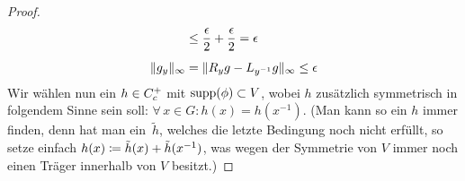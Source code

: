 \begin{proof}
\begin{align*}
        &\leq \frac{\epsilon}{2} + \frac{\epsilon}{2} = \epsilon        %
        \\[1ex]
        \supnorm{ g_y }                                                 %
        &=    \supnorm{ R_yg - L_{y^{-1}}g }                            %
         \leq \epsilon                                                  %
    \end{align*}
    Wir wählen nun ein $h\in C_c^+$ mit $\operatorname{supp}(\phi)\subset V$, wobei $h$
    zusätzlich symmetrisch in folgendem Sinne sein soll: $\forall\,x\in G\colon
    h(x) = h(x^{-1})$. (Man kann so ein $h$ immer finden, denn hat man ein~$\tilde h$,
    welches die letzte Bedingung noch nicht erfüllt, so setze einfach 
    $h(x) \coloneqq \tilde h(x) + \tilde h(x^{-1})$, was wegen der Symmetrie von
    $V$ immer noch einen Träger innerhalb von $V$ besitzt.)
    

\end{proof}
